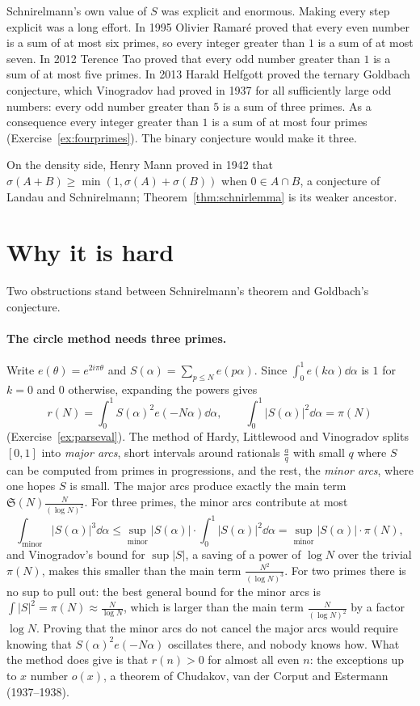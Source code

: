 \begin{remark}
Schnirelmann's own value of $S$ was explicit and enormous. Making every step explicit was a long effort. In 1995 Olivier Ramar\'e proved that every
even number is a sum of at most six primes, so every integer greater than $1$ is a sum of at most seven. In 2012 Terence Tao proved that every odd
number greater than $1$ is a sum of at most five primes. In 2013 Harald Helfgott proved the ternary Goldbach conjecture, which Vinogradov had proved
in 1937 for all sufficiently large odd numbers: every odd number greater than $5$ is a sum of three primes. As a consequence every integer greater
than $1$ is a sum of at most four primes (Exercise~\ref{ex:fourprimes}). The binary conjecture would make it three.

On the density side, Henry Mann proved in 1942 that $\sigma(A+B)\ge\min(1,\sigma(A)+\sigma(B))$ when $0\in A\cap B$, a conjecture of Landau and
Schnirelmann; Theorem~\ref{thm:schnirlemma} is its weaker ancestor.
\end{remark}

\section{Why it is hard}

Two obstructions stand between Schnirelmann's theorem and Goldbach's conjecture.

\paragraph{The circle method needs three primes.} Write $e(\theta)=e^{2i\pi\theta}$ and $S(\alpha)=\sum_{p\le N}e(p\alpha)$. Since
$\int_0^1e(k\alpha)\dd\alpha$ is $1$ for $k=0$ and $0$ otherwise, expanding the powers gives
\[
r(N)=\int_0^1S(\alpha)^2e(-N\alpha)\dd\alpha,\qquad\int_0^1|S(\alpha)|^2\dd\alpha=\pi(N)
\]
(Exercise~\ref{ex:parseval}). The method of Hardy, Littlewood and Vinogradov splits $[0,1]$ into \emph{major arcs}, short intervals around rationals
$\frac aq$ with small $q$ where $S$ can be computed from primes in progressions, and the rest, the \emph{minor arcs}, where one hopes $S$ is small. The
major arcs produce exactly the main term $\mathfrak S(N)\frac N{(\log N)^2}$. For three primes, the minor arcs contribute at most
\[
\int_{\text{minor}}|S(\alpha)|^3\dd\alpha\le\sup_{\text{minor}}|S(\alpha)|\cdot\int_0^1|S(\alpha)|^2\dd\alpha=\sup_{\text{minor}}|S(\alpha)|\cdot\pi(N),
\]
and Vinogradov's bound for $\sup|S|$, a saving of a power of $\log N$ over the trivial $\pi(N)$, makes this smaller than the main term
$\frac{N^2}{(\log N)^3}$. For two primes there is no sup to pull out: the best general bound for the minor arcs is $\int|S|^2=\pi(N)\approx\frac N{\log N}$,
which is larger than the main term $\frac N{(\log N)^2}$ by a factor $\log N$. Proving that the minor arcs do not cancel the major arcs would require
knowing that $S(\alpha)^2e(-N\alpha)$ oscillates there, and nobody knows how. What the method does give is that $r(n)>0$ for almost all even $n$: the
exceptions up to $x$ number $o(x)$, a theorem of Chudakov, van der Corput and Estermann (1937--1938).

